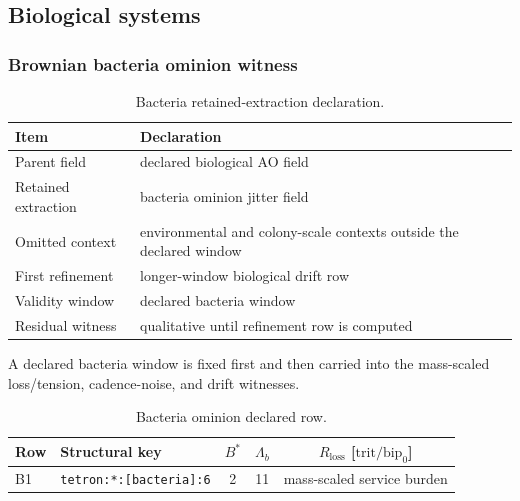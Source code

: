 \subsection{Biological systems}

\subsubsection{Brownian bacteria ominion witness}
\label{man:brownian-bacteria-witness}

\begin{table}[H]
\centering
\caption{Bacteria retained-extraction declaration.}
\label{tab:bacteria-retention}
\begin{threeparttable}
\begin{tabularx}{\linewidth}{@{}lX@{}}
\toprule
Item & Declaration \\
\midrule
Parent field & declared biological AO field \\
Retained extraction & bacteria ominion jitter field \\
Omitted context & environmental and colony-scale contexts outside the declared window \\
First refinement & longer-window biological drift row \\
Validity window & declared bacteria window \\
Residual witness & qualitative until refinement row is computed \\
\bottomrule
\end{tabularx}
\end{threeparttable}
\end{table}

A declared bacteria window is fixed first and then carried into the mass-scaled loss/tension, cadence-noise, and drift witnesses.

\begin{table}[H]
\centering
\caption{Bacteria ominion declared row.}
\label{tab:bacteria-ominion-row}
\begin{threeparttable}
\small
\begin{tabularx}{\linewidth}{@{}lXccc@{}}
\toprule
Row & Structural key & $B^*$ & $\Lambda_b$ & $R_{\mathrm{loss}}$ [\(\mathrm{trit}/\mathrm{bip}_0\)] \\
\midrule
B1 & \texttt{tetron:*:[bacteria]:6} & 2 & 11 & mass-scaled service burden \\
\bottomrule
\end{tabularx}
\end{threeparttable}
\end{table}

